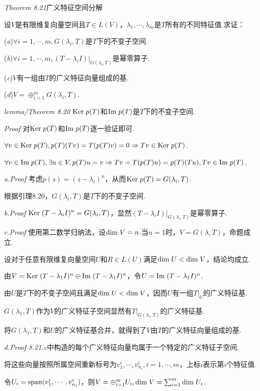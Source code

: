 \textit{Theorem 8.21}{\kaishu 广义特征空间分解}

设\(V\)是有限维复向量空间且\(T \in L(V)\)，\(\lambda_1,\cdots,\lambda_m\)是\(T\)所有的不同特征值.求证：

(\textit{a})\(\forall i=1,\cdots,m,G(\lambda_i,T)\)是\(T\)下的不变子空间.

(\textit{b})\(\forall i=1,\cdots,m,(T-\lambda_i I)|_{G(\lambda_i,T)}\)是幂零算子.

(\textit{c})\(V\)有一组由\(T\)的广义特征向量组成的基.

(\textit{d})\(V=\oplus_{i=1}^m G(\lambda_i,T)\).

\textit{lemma/Theorem 8.20}
\(\mathrm{Ker \;} p(T)\)和\(\mathrm{Im \;} p(T)\)是\(T\)下的不变子空间.

\textit{Proof}
对\(\mathrm{Ker \;} p(T)\)和\(\mathrm{Im \;} p(T)\)逐一验证即可.

\(\forall v \in \mathrm{Ker \;} p(T),p(T)(Tv)=T(p(T)v)=0 \Rightarrow Tv \in \mathrm{Ker \;} p(T)\).

\(\forall v \in \mathrm{Im \;} p(T),\exists u \in V,p(T)u=v \Rightarrow Tv=T(p(T)u)=p(T)(Tu),Tv \in \mathrm{Im \;} p(T)\).

\textit{a.Proof}
考虑\(p(z)=(z-\lambda_i)^n\)，从而\(\mathrm{Ker \;} p(T)=G(\lambda_i,T)\).

根据引理8.20，\(G(\lambda_i,T)\)是\(T\)下的不变子空间.

\textit{b.Proof}
\(\mathrm{Ker \;} (T-\lambda_i I)^n=G(\lambda_i,T)\)，显然\((T-\lambda_i I)|_{G(\lambda_i,T)}\)是幂零算子.

\textit{c.Proof}
使用第二数学归纳法，设\(\mathrm{dim \;} V=n\).当\(n=1\)时，\(V=G(\lambda,T)\)，命题成立.

设对于任意有限维复向量空间\(U\)和\(R \in L(U)\)满足\(\mathrm{dim \;} U<\mathrm{dim \;} V\)，结论均成立.

由\(V=\mathrm{Ker \;} (T-\lambda_1 I)^n \oplus \mathrm{Im \;} (T-\lambda_1 I)^n\)，令\(U=\mathrm{Im \;} (T-\lambda_1 I)^n\).

由\(U\)是\(T\)下的不变子空间且满足\(\mathrm{dim \;} U<\mathrm{dim \;} V\)，因而\(U\)有一组\(T|_U\)的广义特征基.

\(G(\lambda_1,T)\)作为\(V\)的广义特征子空间显然有\(T|_{G(\lambda_i,T)}\)的广义特征基.

将\(G(\lambda_1,T)\)和\(U\)的广义特征基合并，就得到了\(V\)由\(T\)的广义特征向量组成的基.

\textit{d.Proof}
\textit{8.21.c}中构造的每个广义特征向量均属于一个特定的广义特征子空间.

将这些向量按照所属空间重新标号为\(v_1^i,\cdots,v_{n_i}^i,i=1,\cdots,m\)，上标\(i\)表示第\(i\)个特征值.

令\(U_i=\mathrm{span}(v_1^i,\cdots,v_{n_i}^i)\)，则\(V=\oplus_{i=1}^m U_i,\mathrm{dim \;} V=\sum_{i=1}^m \mathrm{dim \;} U_i\).

